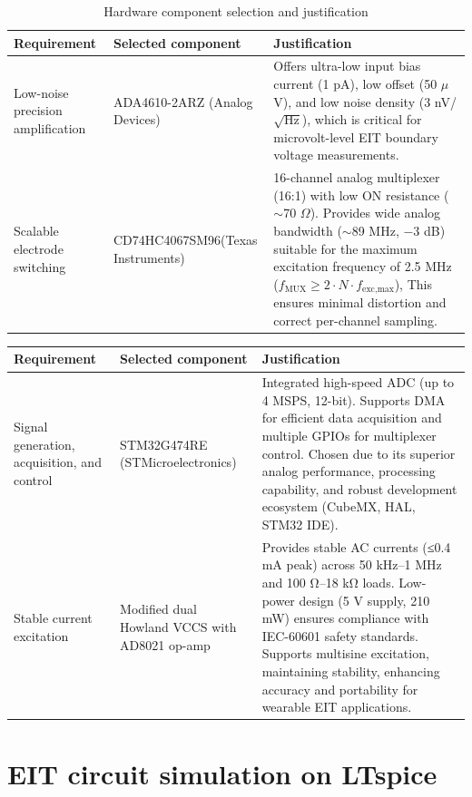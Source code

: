 \begin{table}[H]
\centering
\caption{Hardware component selection and justification}
\begin{tabular}{|p{4cm}|p{5cm}|p{7cm}|}
\hline
\textbf{Requirement} & \textbf{Selected component} & \textbf{Justification} \\
\hline
Low-noise precision amplification & ADA4610-2ARZ (Analog Devices) & Offers ultra-low input bias current (1 pA), low offset (50 $\mu$V), and low noise density (3 nV/$\sqrt{\text{Hz}}$), which is critical for microvolt-level EIT boundary voltage measurements\cite{ada4610}.\\
\hline
Scalable electrode switching & CD74HC4067SM96(Texas Instruments) & 16-channel analog multiplexer (16:1) with low ON resistance ($\sim$70 $\Omega$). Provides wide analog bandwidth ($\sim$89 MHz, $-3$ dB) suitable for the maximum excitation frequency of 2.5 MHz ($f_{\text{MUX}} \geq 2 \cdot N \cdot f_{\text{exc,max}}$), This ensures minimal distortion and correct per-channel sampling\cite{cd74hc4067}.\\

\hline
\end{tabular}
\end{table}
\begin{table}[H]
\centering
\begin{tabular}{|p{4cm}|p{5cm}|p{7cm}|}
\hline
\textbf{Requirement} & \textbf{Selected component} & \textbf{Justification} \\
\hline
Signal generation, acquisition, and control & STM32G474RE (STMicroelectronics) & Integrated high-speed ADC (up to 4 MSPS, 12-bit). Supports DMA for efficient data acquisition and multiple GPIOs for multiplexer control. Chosen due to its superior analog performance, processing capability, and robust development ecosystem (CubeMX, HAL, STM32 IDE)\cite{stm32g474re}. \\
\hline
Stable current excitation & Modified dual Howland VCCS with AD8021 op-amp & Provides stable AC currents (≤0.4 mA peak) across 50 kHz–1 MHz and 100 Ω–18 kΩ loads. Low-power design (5 V supply, 210 mW) ensures compliance with IEC-60601 safety standards. Supports multisine excitation, maintaining stability, enhancing accuracy and portability for wearable EIT applications\cite{ouni2024}.\\
\hline
\end{tabular}
\end{table}


\section{EIT circuit simulation on LTspice}
\label{sec:eit-ltspice}

